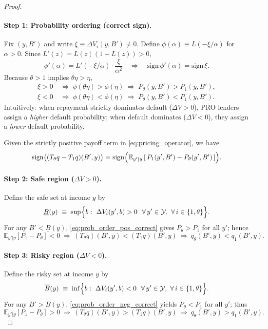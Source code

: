 \documentclass[12pt]{article}
\theoremstyle{plain}
\newcommand{\E}{\mathbb{E}}
\newcommand{\Y}{\mathcal{Y}}
\begin{document}
\begin{proof}
	\paragraph{Step 1: Probability ordering (correct sign).}
	Fix $(y,B')$ and write $\xi\equiv \Delta V_i(y,B')\neq 0$. Define
	$\phi(\alpha)\equiv L(-\xi/\alpha)$ for $\alpha>0$. Since
	$L'(z)=L(z)(1-L(z))>0$,
	\[
		\phi'(\alpha)=L'(-\xi/\alpha)\cdot\frac{\xi}{\alpha^2}
		\quad\Rightarrow\quad
		\mathrm{sign}\,\phi'(\alpha)=\mathrm{sign}\,\xi.
	\]
	Because $\theta>1$ implies $\theta\eta>\eta$,
	\begin{align}
		\xi>0 & \;\Rightarrow\; \phi(\theta\eta)>\phi(\eta)
		\;\Rightarrow\; P_\theta(y,B')>P_1(y,B'),
		\label{eq:prob_order_pos_correct}                   \\
		\xi<0 & \;\Rightarrow\; \phi(\theta\eta)<\phi(\eta)
		\;\Rightarrow\; P_\theta(y,B')<P_1(y,B').
		\label{eq:prob_order_neg_correct}
	\end{align}
	Intuitively: when repayment strictly dominates default (\(\Delta V>0\)), PRO lenders assign a \emph{higher} default probability; when default dominates (\(\Delta V<0\)), they assign a \emph{lower} default probability.

	Given the strictly positive payoff term in \eqref{eq:pricing_operator}, we have
	\begin{equation}
		\mathrm{sign}\bigl((T_\theta q-T_1 q)(B',y)\bigr)
		= \mathrm{sign}\Bigl(\E_{y'|y}\,[\,P_1(y',B')-P_\theta(y',B')\,]\Bigr).
		\label{eq:operator_sign_correct}
	\end{equation}

	\paragraph{Step 2: Safe region (\(\Delta V>0\)).}
	Define the safe set at income \(y\) by
	\[
		\underline{B}(y)\;\equiv\;\sup\Bigl\{b:\ \Delta V_i(y',b)>0\ \ \forall\,y'\in\Y,\ \forall\,i\in\{1,\theta\}\Bigr\}.
	\]
	For any \(B'<\underline{B}(y)\), \eqref{eq:prob_order_pos_correct} gives
	\(P_\theta>P_1\) for all $y'$; hence
	\[
		\E_{y'|y}[P_1-P_\theta]<0
		\ \Rightarrow\
		(T_\theta q)(B',y)<(T_1 q)(B',y)
		\ \Rightarrow\
		q_\theta(B',y)<q_1(B',y).
	\]

	\paragraph{Step 3: Risky region (\(\Delta V<0\)).}
	Define the risky set at income \(y\) by
	\[
		\overline{B}(y)\;\equiv\;\inf\Bigl\{b:\ \Delta V_i(y',b)<0\ \ \forall\,y'\in\Y,\ \forall\,i\in\{1,\theta\}\Bigr\}.
	\]
	For any \(B'>\overline{B}(y)\), \eqref{eq:prob_order_neg_correct} yields
	\(P_\theta<P_1\) for all $y'$; thus
	\[
		\E_{y'|y}[P_1-P_\theta]>0
		\ \Rightarrow\
		(T_\theta q)(B',y)>(T_1 q)(B',y)
		\ \Rightarrow\
		q_\theta(B',y)>q_1(B',y).
	\]


\end{proof}
\end{document}
